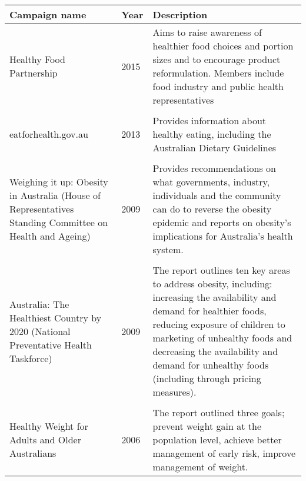 \bgroup
\def\rowSpace{-10pt}
\begin{tabularx}{\columnwidth}{p{2.9cm}l>{\arraybackslash}X}
\toprule
{\textbf{Campaign name}} & \textbf{Year} & \textbf{Description} \\ 
\midrule
{Healthy Food \mbox{Partnership}} & 2015 & Aims to raise awareness of healthier food choices and portion sizes and to encourage product reformulation. Members include food industry and public health representatives \\ \relax \null & & \\[\rowSpace]
{eatforhealth.gov.au} & 2013 & Provides information about healthy eating, including the Australian Dietary Guidelines \\ \relax \null & & \\[\rowSpace]
{Weighing it up: Obesity in Australia (House of Representatives Standing Committee on Health and Ageing)} & 2009 & Provides recommendations on what governments, industry, individuals and the community can do to reverse the obesity epidemic and reports on obesity's implications for Australia's health system. \\ \relax \null & & \\[\rowSpace] 
{Australia: The Healthiest Country by 2020 (National Preventative Health Taskforce)} & 2009 & The report outlines ten key areas to address obesity, including: increasing the availability and demand for healthier foods, reducing exposure of children to marketing of unhealthy foods and decreasing the availability and demand for unhealthy foods (including through pricing measures). \\ \relax \null & & \\[\rowSpace]
{Healthy Weight for Adults and Older Australians} & 2006 & The report outlined three goals; prevent weight gain at the population level, achieve better management of early risk, improve management of weight. \\ 
\bottomrule
\end{tabularx}
\egroup